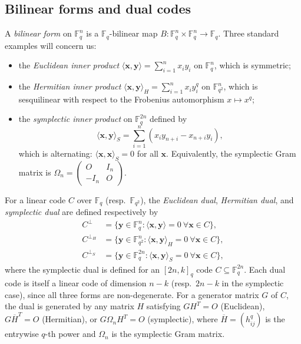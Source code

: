 \documentclass[10pt,a4paper]{amsart}
\newcommand{\F}{\mathbb{F}}
\begin{document}
\subsection{Bilinear forms and dual codes}\label{sec:prelim-dual}

A \emph{bilinear form} on $\F_q^n$ is a $\F_q$-bilinear map $B : \F_q^n \times \F_q^n \to \F_q$.
Three standard examples will concern us:
\begin{itemize}
\item the \emph{Euclidean inner product} $\langle \mathbf{x}, \mathbf{y} \rangle = \sum_{i=1}^n x_i y_i$
      on $\F_q^n$, which is symmetric;
\item the \emph{Hermitian inner product} $\langle \mathbf{x}, \mathbf{y} \rangle_H = \sum_{i=1}^n x_i y_i^q$
      on $\F_{q^2}^n$, which is sesquilinear with respect to the Frobenius automorphism $x \mapsto x^q$;
\item the \emph{symplectic inner product} on $\F_q^{2n}$ defined by
      \[
        \langle \mathbf{x}, \mathbf{y} \rangle_S = \sum_{i=1}^{n} (x_i y_{n+i} - x_{n+i} y_i),
      \]
      which is alternating: $\langle \mathbf{x}, \mathbf{x} \rangle_S = 0$ for all $\mathbf{x}$.
      Equivalently, the symplectic Gram matrix is $\Omega_n = \begin{pmatrix} O & I_n \\ -I_n & O \end{pmatrix}$.
\end{itemize}
For a linear code $C$ over $\F_q$ (resp.\ $\F_{q^2}$), the \emph{Euclidean dual},
\emph{Hermitian dual}, and \emph{symplectic dual} are defined respectively by
\begin{align*}
  C^\perp &= \{\mathbf{y} \in \F_q^n : \langle \mathbf{x}, \mathbf{y} \rangle = 0 \ \forall \mathbf{x} \in C\}, \\
  C^{\perp_H} &= \{\mathbf{y} \in \F_{q^2}^n : \langle \mathbf{x}, \mathbf{y} \rangle_H = 0 \ \forall \mathbf{x} \in C\}, \\
  C^{\perp_S} &= \{\mathbf{y} \in \F_q^{2n} : \langle \mathbf{x}, \mathbf{y} \rangle_S = 0 \ \forall \mathbf{x} \in C\},
\end{align*}
where the symplectic dual is defined for an $[2n, k]_q$ code $C \subseteq \F_q^{2n}$.
Each dual code is itself a linear code of dimension $n - k$ (resp.\ $2n - k$ in the symplectic case),
since all three forms are non-degenerate.
For a generator matrix $G$ of $C$, the dual is generated by any matrix $H$ satisfying
$G H^T = O$ (Euclidean), $G \overline{H}^T = O$ (Hermitian), or $G \Omega_n H^T = O$ (symplectic),
where $\overline{H} = (h_{ij}^q)$ is the entrywise $q$-th power
and $\Omega_n$ is the symplectic Gram matrix.
\end{document}
